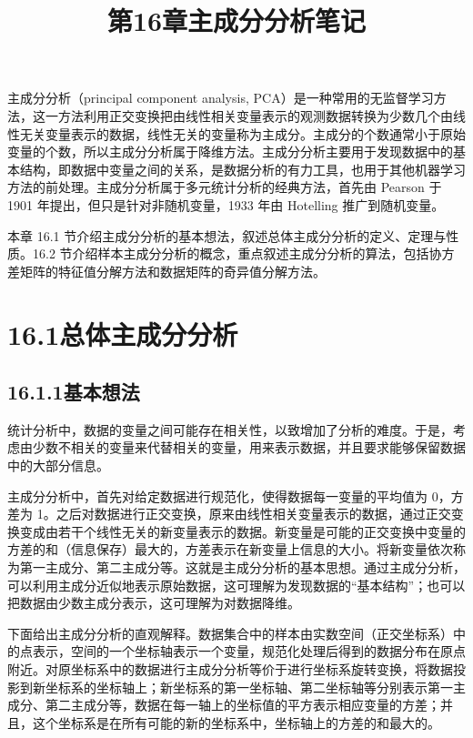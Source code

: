 \documentclass[UTF8,12pt,a4paper,fontset=fandol]{ctexart}
\title{第16章\quad 主成分分析笔记}
\author{}
\date{}
\begin{document}
\maketitle

主成分分析（principal component analysis, PCA）是一种常用的无监督学习方法，这一方法利用正交变换把由线性相关变量表示的观测数据转换为少数几个由线性无关变量表示的数据，线性无关的变量称为主成分。主成分的个数通常小于原始变量的个数，所以主成分分析属于降维方法。主成分分析主要用于发现数据中的基本结构，即数据中变量之间的关系，是数据分析的有力工具，也用于其他机器学习方法的前处理。主成分分析属于多元统计分析的经典方法，首先由 Pearson 于 1901 年提出，但只是针对非随机变量，1933 年由 Hotelling 推广到随机变量。

本章 16.1 节介绍主成分分析的基本想法，叙述总体主成分分析的定义、定理与性质。16.2 节介绍样本主成分分析的概念，重点叙述主成分分析的算法，包括协方差矩阵的特征值分解方法和数据矩阵的奇异值分解方法。

\section*{16.1\quad 总体主成分分析}

\subsection*{16.1.1\quad 基本想法}

统计分析中，数据的变量之间可能存在相关性，以致增加了分析的难度。于是，考虑由少数不相关的变量来代替相关的变量，用来表示数据，并且要求能够保留数据中的大部分信息。

主成分分析中，首先对给定数据进行规范化，使得数据每一变量的平均值为 0，方差为 1。之后对数据进行正交变换，原来由线性相关变量表示的数据，通过正交变换变成由若干个线性无关的新变量表示的数据。新变量是可能的正交变换中变量的方差的和（信息保存）最大的，方差表示在新变量上信息的大小。将新变量依次称为第一主成分、第二主成分等。这就是主成分分析的基本思想。通过主成分分析，可以利用主成分近似地表示原始数据，这可理解为发现数据的“基本结构”；也可以把数据由少数主成分表示，这可理解为对数据降维。

下面给出主成分分析的直观解释。数据集合中的样本由实数空间（正交坐标系）中的点表示，空间的一个坐标轴表示一个变量，规范化处理后得到的数据分布在原点附近。对原坐标系中的数据进行主成分分析等价于进行坐标系旋转变换，将数据投影到新坐标系的坐标轴上；新坐标系的第一坐标轴、第二坐标轴等分别表示第一主成分、第二主成分等，数据在每一轴上的坐标值的平方表示相应变量的方差；并且，这个坐标系是在所有可能的新的坐标系中，坐标轴上的方差的和最大的。
\end{document}
